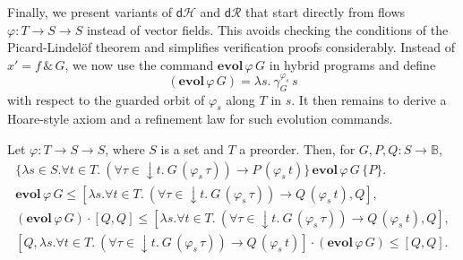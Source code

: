 \documentclass[envcountsame,envcountsect]{llncs}
\newcommand{\dH}{\mathsf{d}\mathcal{H}}
\newcommand{\dR}{\mathsf{d}\mathcal{R}}
\newcommand{\flow}{\varphi}
\newcommand{\bools}{\mathbb{B}}
\begin{document}
Finally, we present variants of $\dH$ and $\dR$ that start directly
from flows $\flow:T\to S\to S$ instead of vector fields.  This avoids
checking the conditions of the Picard-Lindel\"of theorem and
simplifies verification proofs considerably.  Instead of
$x'=f\, \&\, G$, we now use the command
$\mathbf{evol}\, \flow\, G$ in hybrid programs and define
\begin{equation*}
  (\mathbf{evol}\, \flow\, G) = \lambda s.\ \gamma^{\flow_s}_G\, s
\end{equation*}
with respect to the guarded orbit of $\flow_s$ along $T$ in $s$. It
then remains to derive a Hoare-style axiom and a refinement law
for such evolution commands. 
\begin{lemma}\label{P:hr-evlfl}
  Let $\flow:T\to S\to S$, where $S$ is a set and $T$ a
  preorder. Then, for $G,P,Q:S\to \bools$,
\begin{gather*}
\{\lambda s\in S.\forall t\in T.\ (\forall
\tau\in {\downarrow}t.\ G\, (\flow_s\, \tau)) \rightarrow P\,
(\flow_s\, t)\}\, \mathbf{evol}\, \flow\, G\, \{P\}. \label{eq:h-evlfl}\tag{h-evlfl}\\
\mathbf{evol}\, \flow\, G \le [\lambda s.\forall t\in T.\ (\forall
\tau\in {\downarrow}t.\ G\, (\flow_s\, \tau))\to Q\, (\flow_s\, t),Q],\label{eq:r-evlf}\tag{r-evlf}\\
(\mathbf{evol}\, \flow\, G) \cdot \left[Q,Q\right] \le [\lambda s. \forall t\in T.\ (\forall
\tau\in {\downarrow}t.\ G\, (\flow_s\, \tau))\to Q\, (\flow_s\, t),Q],\label{eq:r-evlfl}\tag{r-evlfl}\\
\left[Q,\lambda s. \forall t\in T.\ (\forall
\tau\in {\downarrow}t.\ G\, (\flow_s\, \tau))\to Q\, (\flow_s\, t)\right]\cdot (\mathbf{evol}\, \flow\, G) \le [Q,Q].\label{eq:r-evlfr}\tag{r-evlfr}\\
\end{gather*}
\end{lemma}
\end{document}
